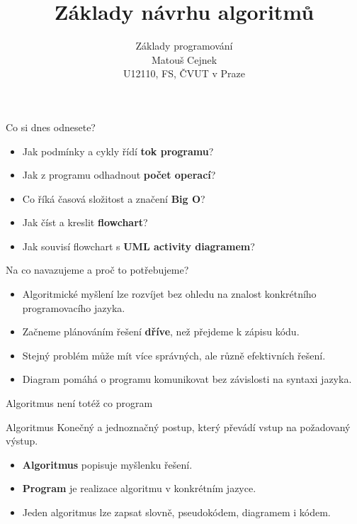 \documentclass[aspectratio=169]{beamer}
\title{Základy návrhu algoritmů}
\subtitle{Základy programování\\Matouš Cejnek\\U12110, FS, ČVUT v Praze}
\author{}
\institute{}
\date{}
\newcommand{\term}[1]{\textcolor{CodeBlue}{\textbf{#1}}}
\begin{document}
\begin{frame}
  \thispagestyle{empty}\titlepage
\end{frame}

\begin{frame}{Co si dnes odnesete?}
  \begin{itemize}
    \item Jak podmínky a cykly řídí \term{tok programu}?
    \item Jak z programu odhadnout \term{počet operací}?
    \item Co říká časová složitost a značení \term{Big O}?
    \item Jak číst a kreslit \term{flowchart}?
    \item Jak souvisí flowchart s \term{UML activity diagramem}?
  \end{itemize}
\end{frame}

\begin{frame}{Na co navazujeme a proč to potřebujeme?}
  \begin{itemize}
    \item Algoritmické myšlení lze rozvíjet bez ohledu na znalost konkrétního programovacího jazyka.
    \item Začneme plánováním řešení \textbf{dříve}, než přejdeme k zápisu kódu.
    \item Stejný problém může mít více správných, ale různě efektivních řešení.
    \item Diagram pomáhá o programu komunikovat bez závislosti na syntaxi jazyka.
  \end{itemize}
\end{frame}

\begin{frame}{Algoritmus není totéž co program}
  \begin{block}{Algoritmus}
    Konečný a jednoznačný postup, který převádí vstup na požadovaný výstup.
  \end{block}
  \begin{itemize}
    \item \term{Algoritmus} popisuje myšlenku řešení.
    \item \term{Program} je realizace algoritmu v konkrétním jazyce.
    \item Jeden algoritmus lze zapsat slovně, pseudokódem, diagramem i kódem.
  \end{itemize}
\end{frame}
\end{document}

